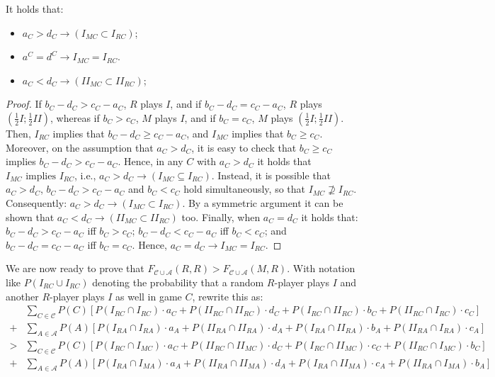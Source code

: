 \documentclass[fleqn,reqno,11pt]{article}
\begin{document}
\begin{lemma} \label{lemma:action implications}
It holds that:
\begin{multicols}{2}
  \begin{itemize}
  \item $a_{C}>d_{C}\rightarrow(I_{MC}\subset I_{RC})$;
  \item $a^{C}=d^{C}\rightarrow I_{MC}=I_{RC}$.
  \item $a_{C}<d_{C}\rightarrow(II_{MC}\subset II_{RC})$;
  \end{itemize}
\end{multicols}
\end{lemma}

\begin{proof}
  If $b_{C}-d_{C}>c_{C}-a_{C}$, $R$ plays $I$, and if $b_{C}-d_{C}=c_{C}-a_{C}$, $R$ plays
  $(\frac{1}{2}I;\frac{1}{2}II)$, whereas if $b_{C}>c_{C}$, $M$ plays $I$, and if
  $b_{C}=c_{C}$, $M$ plays $(\frac{1}{2}I;\frac{1}{2}II)$.  Then, $I_{RC}$ implies that
  $b_{C}-d_{C}\geq c_{C}-a_{C}$, and $I_{MC}$ implies that $b_{C}\geq c_{C}$. Moreover, on the
  assumption that $a_{C}>d_{C}$, it is easy to check that $b_{C}\geq c_{C}$ implies
  $b_{C}-d_{C}>c_{C}-a_{C}$.  Hence, in any $C$ with $a_{C}>d_{C}$ it holds that
  $I_{MC}\mbox{ implies }I_{RC}$, i.e., $a_{C}>d_{C}\rightarrow(I_{MC}\subseteq I_{RC})$.
  Instead, it is possible that $a_{C}>d_{C}$, $b_{C}-d_{C}>c_{C}-a_{C}$ and $b_{C}<c_{C}$ hold
  simultaneously, so that $I_{MC}\nsupseteq I_{RC}$.  Consequently:
  $a_{C}>d_{C}\rightarrow(I_{MC}\subset I_{RC})$.  By a symmetric argument it can be shown that
  $a_{C}<d_{C}\rightarrow(II_{MC}\subset II_{RC})$ too. Finally, when $a_{C}=d_{C}$ it holds
  that: $b_{C}-d_{C}>c_{C}-a_{C}$ iff $b_{C}>c_{C}$; $b_{C}-d_{C}<c_{C}-a_{C}$ iff
  $b_{C}<c_{C}$; and $b_{C}-d_{C}=c_{C}-a_{C}$ iff $b_{C}=c_{C}$. Hence,
  $a_{C}=d_{C}\rightarrow I_{MC}=I_{RC}$.
\end{proof}

We are now ready to prove that
$F_{\mathcal{C}\cup\mathcal{A}}(R,R)>F_{\mathcal{C}\cup\mathcal{A}}(M,R)$. With notation like
$P(I_{RC} \cup I_{RC})$ denoting the probability that a random $R$-player plays $I$ and another
$R$-player plays $I$ as well in game $C$, rewrite this as:
\begin{align*}
  & \sum_{C \in \mathcal{C}}P(C)[P(I_{RC}\cap I_{RC})\cdot a_{C}+P(II_{RC}\cap II_{RC})\cdot
  d_{C}+P(I_{RC}\cap II_{RC})\cdot b_{C}+P(II_{RC}\cap I_{RC})\cdot c_{C}] 
  \\ + & \sum_{A \in
    \mathcal{A}}P(A)[P(I_{RA}\cap I_{RA})\cdot a_{A}+P(II_{RA}\cap II_{RA})\cdot
  d_{A}+P(I_{RA}\cap II_{RA})\cdot b_{A}+P(II_{RA}\cap I_{RA})\cdot c_{A}]\\
  > & \sum_{C \in
    \mathcal{C}}P(C)[P(I_{RC}\cap I_{MC})\cdot a_{C}+P(II_{RC}\cap II_{MC})\cdot
  d_{C}+P(I_{RC}\cap II_{MC})\cdot c_{C}+P(II_{RC}\cap I_{MC})\cdot b_{C}] \\
   + & \sum_{A \in
    \mathcal{A}}P(A)[P(I_{RA}\cap I_{MA})\cdot a_{A}+P(II_{RA}\cap II_{MA})\cdot
  d_{A}+P(I_{RA}\cap II_{MA})\cdot c_{A}+P(II_{RA}\cap I_{MA})\cdot b_{A}]
\end{align*}
\end{document}
